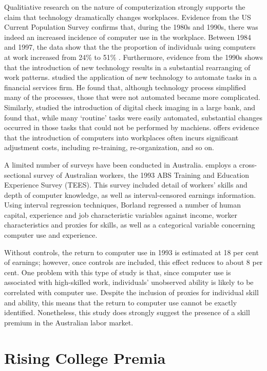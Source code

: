 Qualitiative research on the nature of computerization strongly supports the claim that technology dramatically changes workplaces. Evidence from the US Current Population Survey confirms that, during the 1980s and 1990s, there was indeed an increased incidence of computer use in the workplace. Between 1984 and 1997, the data show that the the proportion of individuals using computers at work increased from 24\% to 51\% \cite{Friedberg2003}. Furthermore, evidence from the 1990s shows that the introduction of new technology results in a substantial rearranging of work patterns. \citet{Levy1996} studied the application of new technology to automate tasks in a financial services firm. He found that, although technology process simplified many of the processes, those that were not automated became more complicated. Similarly, \citet{Autor2002} studied the introduction of digital check imaging in a large bank, and found that, while many `routine' tasks were easily automated, substantial changes occurred in those tasks that could not be performed by machiens. \citet{Bresnahan2002} offers evidence that the introduction of computers into workplaces often incurs significant adjustment costs, including re-training, re-organization, and so on.

A limited number of surveys have been conducted in Australia. \citet{Borland2004} employs a cross-sectional survey of Australian workers, the 1993 ABS Training and Education Experience Survey (TEES). This survey included detail of workers' skills and depth of computer knowledge, as well as interval-censored earnings information. Using interval regression techniques, Borland regressed a number of human capital, experience and job characteristic variables against income, worker characteristics and proxies for skills, as well as a categorical variable concerning computer use and experience. 

Without controls, the return to computer use in 1993 is estimated at 18 per cent of earnings; however, once controls are included, this effect reduces to about 8 per cent. One problem with this type of study is that, since computer use is associated with high-skilled work, individuals' unobserved ability is likely to be correlated with computer use. Despite the inclusion of proxies for individual skill and ability, this means that the return to computer use cannot be exactly identified. Nonetheless, this study does strongly suggest the presence of a skill premium in the Australian labor market.

\section{Rising College Premia}

